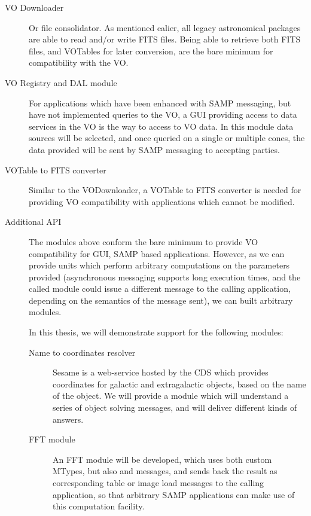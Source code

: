 		\begin{description}
			\item[VO Downloader] Or file consolidator. As mentioned
			ealier, all legacy astronomical packages are able to
			read and/or write FITS files. Being able to retrieve
			both FITS files, and VOTables for later conversion, are
			the bare minimum for compatibility with the VO.
			
			\item[VO Registry and DAL module] For applications which
			have been enhanced with SAMP messaging, but have not
			implemented queries to the VO, a GUI providing access
			to data services in the VO is the way to access to
			VO data. In this module data sources will be selected,
			and once queried on a single or multiple cones, the
			data provided will be sent by SAMP messaging to
			accepting parties.
			
			\item[VOTable to FITS converter] Similar to the
			VODownloader, a VOTable to FITS converter is needed
			for providing VO compatibility with applications which
			cannot be modified.
			
			\item[Additional API] The modules above conform the bare
			minimum to provide VO compatibility for GUI, SAMP based
			applications. However, as we can provide units which
			perform arbitrary computations on the parameters
			provided (asynchronous messaging supports long execution
			times, and the called module could issue a different
			message to the calling application, depending on the
			semantics of the message sent), we can built arbitrary
			modules.
			
			In this thesis, we will demonstrate support for the
			following modules:
			
			\begin{description}
				\item[Name to coordinates resolver] Sesame is a
				web-service hosted by the CDS which provides
				coordinates for galactic and extragalactic objects,
				based on the name of the object. We will provide a
				module which will understand a series of object
				solving messages, and will deliver different kinds
				of answers.
				
				\item[FFT module] An FFT module will be developed,
				which uses both custom MTypes, but also
				 and 
				messages, and sends back the result as
				corresponding table or image load messages to the
				calling application, so that arbitrary SAMP
				applications can make use of this computation
				facility.
			\end{description}
			

\end{description}
